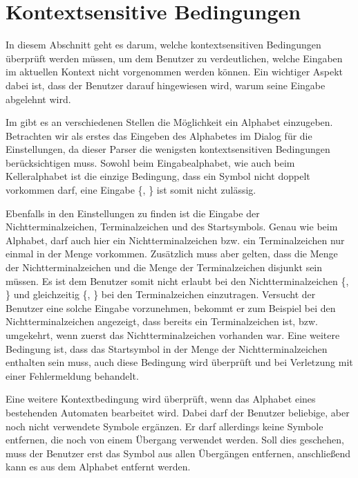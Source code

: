 \section{Kontextsensitive Bedingungen}\label{ParserContext}

In diesem Abschnitt geht es darum, welche kontextsensitiven Bedingungen
über\-prüft werden müssen, um dem Benutzer zu verdeutlichen, welche Eingaben im
aktuellen Kontext nicht vorgenommen werden können. Ein wichtiger Aspekt dabei
ist, dass der Benutzer darauf hingewiesen wird, warum seine Eingabe abgelehnt
wird.\vspace{10pt}

Im \gtitool gibt es an verschiedenen Stellen die Möglichkeit ein Alphabet
einzugeben. Betrachten wir als erstes das Eingeben des Alphabetes im Dialog für
die Einstellungen, da dieser Parser die wenigsten kontextsensitiven Bedingungen
berücksichtigen muss. Sowohl beim Eingabealphabet, wie auch beim Kelleralphabet
ist die einzige Bedingung, dass ein Symbol nicht doppelt vorkommen darf, eine
Eingabe \{, \} ist somit nicht zulässig.\vspace{10pt}

Ebenfalls in den Einstellungen zu finden ist die Eingabe der
Nichtterminalzeichen, Terminalzeichen und des Startsymbols. Genau wie beim
Alphabet, darf auch hier ein Nichtterminalzeichen bzw. ein Terminalzeichen nur
einmal in der Menge vorkommen. Zusätzlich muss aber gelten, dass die Menge der
Nichtterminalzeichen  und die Menge der Terminalzeichen disjunkt sein müssen. Es
ist dem Benutzer somit nicht erlaubt bei den Nichtterminalzeichen
\{, \} und gleichzeitig
\{, \} bei den Terminalzeichen einzutragen.
Versucht der Benutzer eine solche Eingabe vorzunehmen, bekommt er zum Beispiel
bei den Nichtterminalzeichen angezeigt, dass  bereits ein
Terminalzeichen ist, bzw. umgekehrt, wenn zuerst das Nichtterminalzeichen
vorhanden war. Eine weitere Bedingung ist, dass das Startsymbol in der Menge der
Nichtterminalzeichen enthalten sein muss, auch diese Bedingung wird überprüft
und bei Verletzung mit einer Fehlermeldung behandelt.\vspace{10pt}

Eine weitere Kontextbedingung wird überprüft, wenn das Alphabet eines
bestehenden Automaten bearbeitet wird. Dabei darf der Benutzer beliebige, aber
noch nicht verwendete Symbole ergänzen. Er darf allerdings keine Symbole
entfernen, die noch von einem Übergang verwendet werden. Soll dies geschehen,
muss der Benutzer erst das Symbol aus allen Übergängen entfernen,
anschließend kann es aus dem Alphabet entfernt werden.\vspace{10pt}

